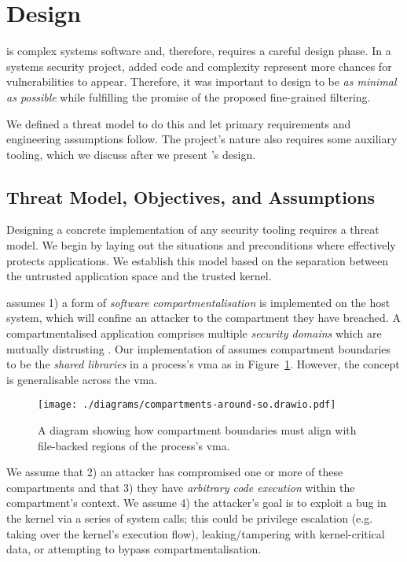 \section{Design} \label{sec:design}

\af is complex systems software and, therefore, requires a careful
design phase. In a systems security project, added code and complexity
represent more chances for vulnerabilities to appear. Therefore, it was
important to design \af to be \textit{as minimal as possible} while
fulfilling the promise of the proposed fine-grained filtering.

We defined a threat model to do this and let primary requirements and
engineering assumptions follow. The project's nature also requires some auxiliary
tooling, which we discuss after we present \af's design. 

\subsection{Threat Model, Objectives, and Assumptions}\label{subsec:objs-assumpions-tm}


Designing a concrete implementation of any security tooling requires a threat
model. We begin by laying out the situations and preconditions where \af effectively
protects applications. We establish this model based on the separation
between the untrusted application space and the trusted kernel. 

\af assumes 1) a form of \textit{software compartmentalisation} is implemented
on the host system, which will confine an attacker to the compartment 
they have breached. A compartmentalised application comprises multiple \textit
{security domains} which are mutually distrusting \cite{SOK}. Our
implementation of \af assumes compartment boundaries to be the \textit{shared
libraries} in a process's \ac{vma} as in Figure~\ref{fig:compartments-around-vma}. However, the concept is generalisable across the \ac{vma}.

\begin{figure}[ht]
    \centering
    \texttt{[image: ./diagrams/compartments-around-so.drawio.pdf]} 
    \caption{A diagram showing how compartment boundaries must align
    with file-backed regions of the process's \ac{vma}.}
    \label{fig:compartments-around-vma}
\end{figure}

We assume that 2) an attacker has compromised one or more of these compartments and that
3) they have \textit{arbitrary code execution} within the compartment's context. We
assume 4) the attacker's goal is to exploit a bug in the kernel via a series of
system calls; this could be privilege escalation (e.g. taking over the kernel's
execution flow), leaking/tampering with kernel-critical data, or attempting to
bypass compartmentalisation. 

